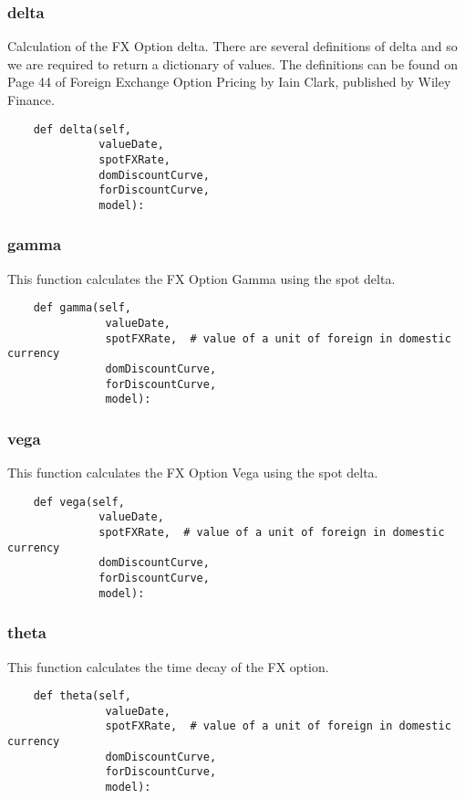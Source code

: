 \documentclass[twoside,11pt]{book}
\begin{document}
\subsubsection*{{\bf delta}}
Calculation of the FX Option delta. There are several definitions of delta and so we are required to return a dictionary of values. The definitions can be found on Page 44 of Foreign Exchange Option Pricing by Iain Clark, published by Wiley Finance.  

\begin{lstlisting}
    def delta(self,
              valueDate,
              spotFXRate,
              domDiscountCurve,
              forDiscountCurve,
              model):
\end{lstlisting}

\subsubsection*{{\bf gamma}}
This function calculates the FX Option Gamma using the spot delta.  

\begin{lstlisting}
    def gamma(self,
               valueDate,
               spotFXRate,  # value of a unit of foreign in domestic currency
               domDiscountCurve,
               forDiscountCurve,
               model):
\end{lstlisting}

\subsubsection*{{\bf vega}}
This function calculates the FX Option Vega using the spot delta.  

\begin{lstlisting}
    def vega(self,
              valueDate,
              spotFXRate,  # value of a unit of foreign in domestic currency
              domDiscountCurve,
              forDiscountCurve,
              model):
\end{lstlisting}

\subsubsection*{{\bf theta}}
This function calculates the time decay of the FX option.  

\begin{lstlisting}
    def theta(self,
               valueDate,
               spotFXRate,  # value of a unit of foreign in domestic currency
               domDiscountCurve,
               forDiscountCurve,
               model):
\end{lstlisting}
\end{document}

